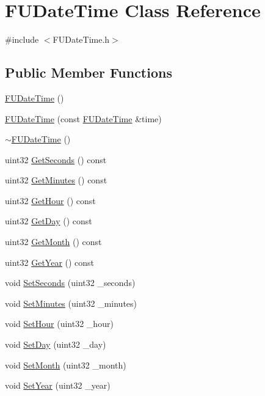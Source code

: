 \hypertarget{classFUDateTime}{
\section{FUDateTime Class Reference}
\label{classFUDateTime}
}


{\ttfamily \#include $<$FUDateTime.h$>$}

\subsection*{Public Member Functions}
\begin{DoxyCompactItemize}
\item 
\hyperlink{classFUDateTime_a3e841a2509d2ff3faaabc8e081beea8f}{FUDateTime} ()
\item 
\hyperlink{classFUDateTime_ac38382150f5c63c6168b8eff80f7359c}{FUDateTime} (const \hyperlink{classFUDateTime}{FUDateTime} \&time)
\item 
\hyperlink{classFUDateTime_af1cee743d781c179dcdb85f1537407df}{$\sim$FUDateTime} ()
\item 
uint32 \hyperlink{classFUDateTime_ac6a02c221215238a779bff61093626b2}{GetSeconds} () const 
\item 
uint32 \hyperlink{classFUDateTime_a3ec9ad7624c058a0790c4de0a984702b}{GetMinutes} () const 
\item 
uint32 \hyperlink{classFUDateTime_abe0949d5c8c1d00a2c164ded6e11b30d}{GetHour} () const 
\item 
uint32 \hyperlink{classFUDateTime_a98db1109451fbc3e6a1544185a44fb73}{GetDay} () const 
\item 
uint32 \hyperlink{classFUDateTime_aa5a4762ef4023a8746684fc9306508e4}{GetMonth} () const 
\item 
uint32 \hyperlink{classFUDateTime_affed2783369ecf09a877ed640dd47923}{GetYear} () const 
\item 
void \hyperlink{classFUDateTime_ac29ee580eb76914ede1b5b1a55720dce}{SetSeconds} (uint32 \_\-seconds)
\item 
void \hyperlink{classFUDateTime_adefd51182822f0bea94e02087dd6433d}{SetMinutes} (uint32 \_\-minutes)
\item 
void \hyperlink{classFUDateTime_ae0418848399c02b37a046bd6afe6eb0d}{SetHour} (uint32 \_\-hour)
\item 
void \hyperlink{classFUDateTime_a824fc5c8edd8727961c2fe29df8333ed}{SetDay} (uint32 \_\-day)
\item 
void \hyperlink{classFUDateTime_af409696781158db5961a43c32050f1fd}{SetMonth} (uint32 \_\-month)
\item 
void \hyperlink{classFUDateTime_a1f8eab94e0f884ef3f10b481672d665f}{SetYear} (uint32 \_\-year)
\end{DoxyCompactItemize}
